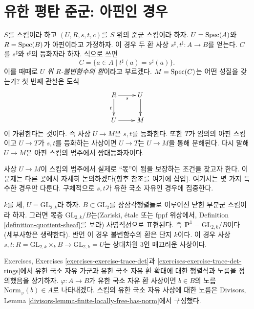 \section{유한 평탄 준군: 아핀인 경우}
\label{section-finite-flat}

\noindent
$S$를 스킴이라 하고 $(U, R, s, t, c)$를 $S$ 위의 준군 스킴이라 하자. $U = \mathop{\mathrm{Spec}}(A)$와
$R = \mathop{\mathrm{Spec}}(B)$가 아핀이라고 가정하자. 이 경우 두 환 사상 $s^\sharp, t^\sharp : A \longrightarrow B$를 얻는다.
$C$를 $s^\sharp$와 $t^\sharp$의 등화자라 하자. 식으로 쓰면
\begin{equation}
\label{equation-invariants}
C = \{a \in A \mid t^\sharp(a) = s^\sharp(a) \}.
\end{equation}
이를 때때로 {\it $U$ 위 $R$-불변함수의 환}이라고 부르겠다. $M = \mathop{\mathrm{Spec}}(C)$는 어떤 성질을 갖는가?
첫 번째 관찰은 도식
$$
\xymatrix{
R \ar[r]_s \ar[d]_t & U \ar[d] \\
U \ar[r] & M
}
$$
이 가환한다는 것이다. 즉 사상 $U \to M$은 $s, t$를 등화한다. 또한 $T$가 임의의 아핀 스킴이고
$U \to T$가 $s, t$를 등화하는 사상이면 $U \to T$는 $U \to M$을 통해 분해된다. 다시 말해
$U \to M$은 아핀 스킴의 범주에서 쌍대등화자이다.

\medskip\noindent
사상 $U \to M$이 스킴의 범주에서 실제로 ``몫''이 됨을 보장하는 조건을 찾고자 한다. 이 문제는 다른 곳에서
자세히 논의하겠다(향후 참조를 여기에 삽입). 여기서는 몇 가지 특수한 경우만 다룬다. 구체적으로 $s, t$가
유한 국소 자유인 경우에 집중한다.

\begin{example}
\label{example-quotient-projective-line}
$k$를 체, $U = \text{GL}_{2, k}$라 하자. $B \subset \text{GL}_2$를 상삼각행렬들로 이루어진 닫힌 부분군 스킴이라 하자.
그러면 몫층 $\text{GL}_{2, k}/B$는(Zariski, \'etale 또는 fppf 위상에서, Definition
\ref{definition-quotient-sheaf}를 보라) 사영직선으로 표현된다. 즉 $\mathbf{P}^1 = \text{GL}_{2, k}/B$이다
(세부사항은 생략한다). 반면 이 경우 불변함수의 환은 단지 $k$이다. 이 경우 사상
$s, t : R = \text{GL}_{2, k} \times_k B \to \text{GL}_{2, k} = U$는 상대차원 $3$인 매끄러운 사상이다.
\end{example}

\noindent
Exercises, Exercises \ref{exercises-exercise-trace-det}과 \ref{exercises-exercise-trace-det-rings}에서 유한 국소 자유
가군과 유한 국소 자유 환 확대에 대한 행렬식과 노름을 정의했음을 상기하자. $\varphi : A \to B$가 유한 국소 자유
환 사상이면 $b \in B$의 노름 $\text{Norm}_\varphi(b) \in A$로 나타내겠다. 스킴의 유한 국소 자유 사상에 대한
노름은 Divisors, Lemma \ref{divisors-lemma-finite-locally-free-has-norm}에서 구성했다.

